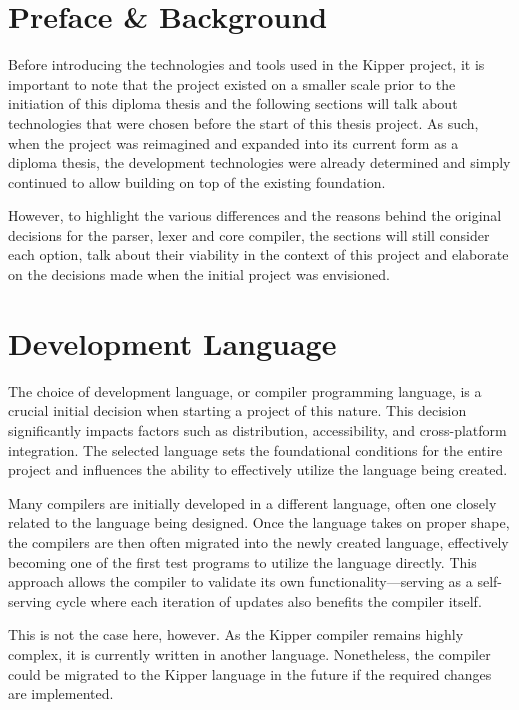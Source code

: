 \section{Preface \& Background}

Before introducing the technologies and tools used in the Kipper project, it is important to note that the project existed on a smaller scale prior to the initiation of this diploma thesis and the following sections will talk about technologies that were chosen before the start of this thesis project. As such, when the project was reimagined and expanded into its current form as a diploma thesis, the development technologies were already determined and simply continued to allow building on top of the existing foundation.

However, to highlight the various differences and the reasons behind the original decisions for the parser, lexer and core compiler, the sections will still consider each option, talk about their viability in the context of this project and elaborate on the decisions made when the initial project was envisioned.

\section{Development Language}

The choice of development language, or compiler programming language, is a crucial initial decision when starting a project of this nature. This decision significantly impacts factors such as distribution, accessibility, and cross-platform integration. The selected language sets the foundational conditions for the entire project and influences the ability to effectively utilize the language being created.

Many compilers are initially developed in a different language, often one closely related to the language being designed. Once the language takes on proper shape, the compilers are then often migrated into the newly created language, effectively becoming one of the first test programs to utilize the language directly. This approach allows the compiler to validate its own functionality—serving as a self-serving cycle where each iteration of updates also benefits the compiler itself.

This is not the case here, however. As the Kipper compiler remains highly complex, it is currently written in another language. Nonetheless, the compiler could be migrated to the Kipper language in the future if the required changes are implemented.

